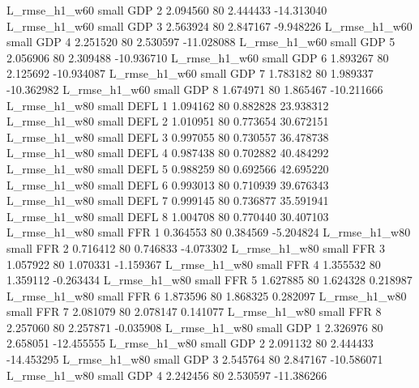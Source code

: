  L_rmse_h1_w60      small      GDP                 2 2.094560 80       2.444433         -14.313040
 L_rmse_h1_w60      small      GDP                 3 2.563924 80       2.847167          -9.948226
 L_rmse_h1_w60      small      GDP                 4 2.251520 80       2.530597         -11.028088
 L_rmse_h1_w60      small      GDP                 5 2.056906 80       2.309488         -10.936710
 L_rmse_h1_w60      small      GDP                 6 1.893267 80       2.125692         -10.934087
 L_rmse_h1_w60      small      GDP                 7 1.783182 80       1.989337         -10.362982
 L_rmse_h1_w60      small      GDP                 8 1.674971 80       1.865467         -10.211666
 L_rmse_h1_w80      small     DEFL                 1 1.094162 80       0.882828          23.938312
 L_rmse_h1_w80      small     DEFL                 2 1.010951 80       0.773654          30.672151
 L_rmse_h1_w80      small     DEFL                 3 0.997055 80       0.730557          36.478738
 L_rmse_h1_w80      small     DEFL                 4 0.987438 80       0.702882          40.484292
 L_rmse_h1_w80      small     DEFL                 5 0.988259 80       0.692566          42.695220
 L_rmse_h1_w80      small     DEFL                 6 0.993013 80       0.710939          39.676343
 L_rmse_h1_w80      small     DEFL                 7 0.999145 80       0.736877          35.591941
 L_rmse_h1_w80      small     DEFL                 8 1.004708 80       0.770440          30.407103
 L_rmse_h1_w80      small      FFR                 1 0.364553 80       0.384569          -5.204824
 L_rmse_h1_w80      small      FFR                 2 0.716412 80       0.746833          -4.073302
 L_rmse_h1_w80      small      FFR                 3 1.057922 80       1.070331          -1.159367
 L_rmse_h1_w80      small      FFR                 4 1.355532 80       1.359112          -0.263434
 L_rmse_h1_w80      small      FFR                 5 1.627885 80       1.624328           0.218987
 L_rmse_h1_w80      small      FFR                 6 1.873596 80       1.868325           0.282097
 L_rmse_h1_w80      small      FFR                 7 2.081079 80       2.078147           0.141077
 L_rmse_h1_w80      small      FFR                 8 2.257060 80       2.257871          -0.035908
 L_rmse_h1_w80      small      GDP                 1 2.326976 80       2.658051         -12.455555
 L_rmse_h1_w80      small      GDP                 2 2.091132 80       2.444433         -14.453295
 L_rmse_h1_w80      small      GDP                 3 2.545764 80       2.847167         -10.586071
 L_rmse_h1_w80      small      GDP                 4 2.242456 80       2.530597         -11.386266
